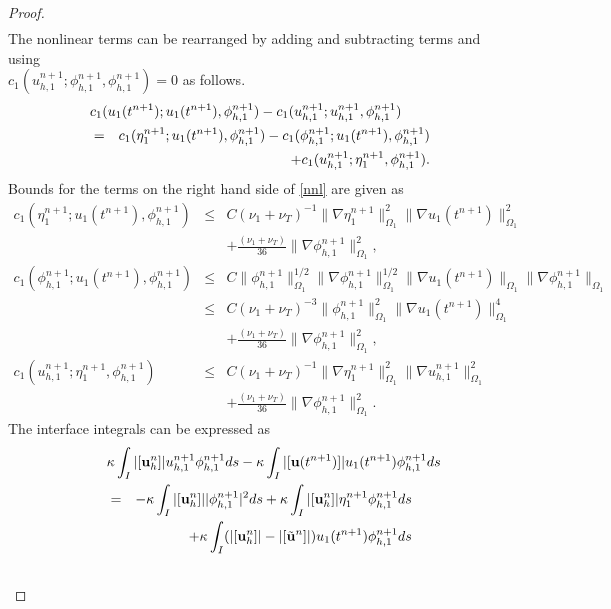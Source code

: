 \documentclass[10pt]{article}%
\numberwithin{equation}{section}
\begin{document}
\begin{proof}
\begin{eqnarray}
	\end{eqnarray}
	The nonlinear terms can be rearranged by adding and subtracting terms and using \\${c_1(u_{h,1}^{n+1};\phi_{h,1}^{n+1},\phi_{h,1}^{n+1})}=0$ as follows.
	\begin{eqnarray}
	\lefteqn{ {c_1(u_{1}(t^{n+1});u_{1}(t^{n+1}),\phi_{h,1}^{n+1})}-{c_1(u_{h,1}^{n+1};u_{h,1}^{n+1},\phi_{h,1}^{n+1})}}\nonumber\\&=&{c_1(\eta_{1}^{n+1};u_{1}(t^{n+1}),\phi_{h,1}^{n+1})}-{c_1(\phi_{h,1}^{n+1};u_{1}(t^{n+1}),\phi_{h,1}^{n+1})}\nonumber\\&&+{c_1(u_{h,1}^{n+1};\eta_{1}^{n+1},\phi_{h,1}^{n+1})}. \label{nnl}
	\end{eqnarray}
	Bounds for the terms on the right hand side of \eqref{nnl} are given as
	\begin{eqnarray}
		{c_1(\eta_{1}^{n+1};u_{1}(t^{n+1}),\phi_{h,1}^{n+1})}&\leq&C{ (\nu_1+\nu_T)}^{-1}\|\nabla\eta_{1}^{n+1}\|_{\Omega_1}^2\|\nabla u_{1}(t^{n+1})\|_{\Omega_1}^2\nonumber\\&&+\frac{{ (\nu_1+\nu_T)}}{36}\|\nabla \phi_{h,1}^{n+1}\|_{\Omega_1}^2,\nonumber\\[5pt]
	{c_1(\phi_{h,1}^{n+1};u_{1}(t^{n+1}),\phi_{h,1}^{n+1})}&\leq&C\|\phi_{h,1}^{n+1}\|_{\Omega_1}^{1/2}\|\nabla \phi_{h,1}^{n+1}\|_{\Omega_1}^{1/2}\|\nabla u_{1}(t^{n+1})\|_{\Omega_1}\|\nabla\phi_{h,1}^{n+1}\|_{\Omega_1}\nonumber\\
	&\leq&C{ (\nu_1+\nu_T)}^{-3}\|\phi_{h,1}^{n+1}\|_{\Omega_1}^2\|\nabla u_{1}(t^{n+1})\|_{\Omega_1}^4\nonumber\\&&+\frac{{ (\nu_1+\nu_T)}}{36}\|\nabla \phi_{h,1}^{n+1}\|_{\Omega_1}^2,\nonumber\\[5pt]
	{c_1(u_{h,1}^{n+1};\eta_{1}^{n+1},\phi_{h,1}^{n+1})} &\leq& C{ (\nu_1+\nu_T)}^{-1}\|\nabla\eta_{1}^{n+1}\|_{\Omega_1}^2\|\nabla u_{h,1}^{n+1}\|_{\Omega_1}^2\nonumber\\&&+\frac{{ (\nu_1+\nu_T)}}{36}\|\nabla \phi_{h,1}^{n+1}\|_{\Omega_1}^2. \label{err7}
	\end{eqnarray}
	The interface integrals can be expressed as  %
	\begin{eqnarray}
	\lefteqn{\kappa \int_{I}|[{\bf u}_h^n]|u_{h,1}^{n+1}\phi_{h,1}^{n+1}ds-\kappa \int_{I}|[{\bf u}(t^{n+1})]|u_1(t^{n+1})\phi_{h,1}^{n+1}ds}\nonumber\\&=&-\kappa \int_{I}|[{\bf u}_h^n]|  |\phi_{h,1}^{n+1}|^2ds+\kappa \int_{I}|[{\bf u}_h^{n}]|\eta_{1}^{n+1}\phi_{h,1}^{n+1}ds\nonumber\\&&+\kappa \int_{I}(|[{\bf u}_h^n]|-|[\tilde{\bf u}^n]|)u_1(t^{n+1})\phi_{h,1}^{n+1}ds\nonumber\\&&

\end{eqnarray}
\end{proof}
\end{document}
